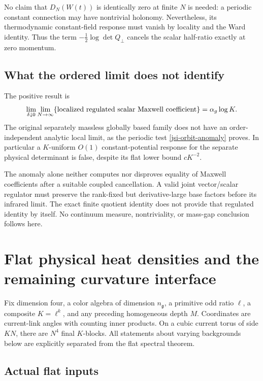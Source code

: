 \documentclass[11pt]{article}
\theoremstyle{remark}
\begin{document}
No claim that \(D_N(W(t))\) is identically zero at finite \(N\)
is needed: a periodic constant connection may have nontrivial
holonomy. Nevertheless, its thermodynamic constant-field
response must vanish by locality and the Ward identity.
Thus the term \(-\frac12\log\det Q_\perp\) cancels the scalar
half-ratio exactly at zero momentum.

\subsection{What the ordered limit does not identify}
\label{jsi-scope}

The positive result is
\[
 \lim_{\delta\downarrow0}\lim_{N\to\infty}
       \{\hbox{localized regulated scalar Maxwell coefficient}\}
                         =\alpha_g\log K.
\]
The original separately massless globally based family does not
have an order-independent analytic local limit, as the periodic
test \eqref{jsi-orbit-anomaly} proves.
In particular a \(K\)-uniform \(O(1)\) constant-potential response
for the separate physical determinant is false, despite its
flat lower bound \(cK^{-2}\).

The anomaly alone neither computes nor disproves equality of
Maxwell coefficients after a suitable coupled cancellation.
A valid joint vector/scalar regulator must preserve the
rank-fixed but derivative-large base factors before its
infrared limit. The exact finite quotient identity does not
provide that regulated identity by itself. No continuum
measure, nontriviality, or mass-gap conclusion follows here.


\section{Flat physical heat densities and the remaining curvature interface}
\label{pvs-section}

Fix dimension four, a color algebra of dimension \(n_{\mathfrak g}\),
a primitive odd ratio \(\ell\), a composite \(K=\ell^k\), and any
preceding homogeneous depth \(M\).
Coordinates are current-link angles with counting inner products.
On a cubic current torus of side \(KN\), there are \(N^4\) final
\(K\)-blocks.
All statements about varying backgrounds below are explicitly
separated from the flat spectral theorem.

\subsection{Actual flat inputs}
\label{pvs-input-section}
\end{document}
